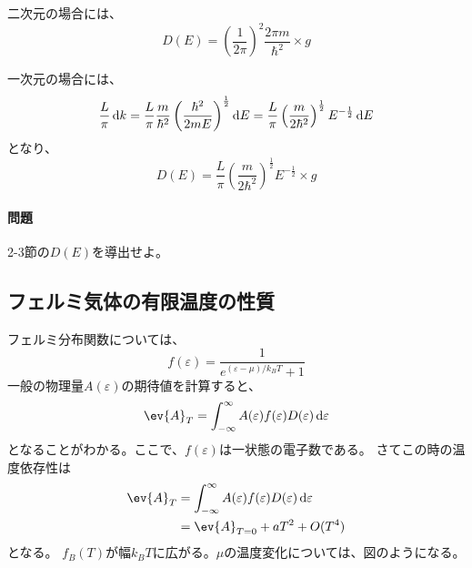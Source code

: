 \documentclass[titlepage]{ltjsarticle}
\begin{document}
二次元の場合には、
\begin{equation}
  D(E) = \left( \frac{1}{2\pi} \right)^2 \frac{2\pi m}{\hbar^2} \times g 
\end{equation}

一次元の場合には、
\begin{equation}
  \frac{L}{\pi} \odif{k} = \frac{L}{\pi} \frac{m}{\hbar^2} \left( \frac{\hbar^2}{2mE} \right)^{\frac{1}{2}} \odif{E} = \frac{L}{\pi} \left( \frac{m}{2 \hbar^2} \right)^{\frac{1}{2}}E^{-\frac{1}{2}} \odif{E}
\end{equation}
となり、
\begin{equation}
  D(E) = \frac{L}{\pi} \left( \frac{m}{2\hbar^2} \right)^{\frac{1}{2}} E^{-\frac{1}{2}} \times g
\end{equation}

\paragraph{問題}
2-3節の\(D(E)\)を導出せよ。


\subsection{フェルミ気体の有限温度の性質}
フェルミ分布関数については、
\begin{equation}
  f(\varepsilon) = \frac{1}{e^{(\varepsilon-\mu)/k_BT}+1}
\end{equation}
一般の物理量\(A(\varepsilon)\)の期待値を計算すると、
\begin{equation}
  \ev{A}_T = \int_{-\infty}^{\infty} A(\varepsilon)f(\varepsilon)D(\varepsilon) \odif{\varepsilon}
\end{equation}
となることがわかる。ここで、\(f(\varepsilon)\)は一状態の電子数である。
さてこの時の温度依存性は
\begin{align}
  \ev{A}_T & = \int_{-\infty}^{\infty} A(\varepsilon)f(\varepsilon)D(\varepsilon) \odif{\varepsilon}\\
  & = \ev{{A}}_{T = 0} + a T^2 + O(T^4)
\end{align}
となる。
\(f_B(T)\)が幅\(k_BT\)に広がる。\(\mu\)の温度変化については、図のようになる。


\end{document}
